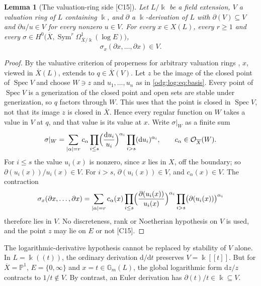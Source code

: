 \documentclass[11pt,oneside]{article}
\numberwithin{equation}{section}
\newtheorem{lemma}[lemma]{Lemma}
\theoremstyle{definition}
\theoremstyle{remark}
\newcommand{\src}[1]{\textup{\textsf{\small[#1]}}}
\newcommand{\Spec}{\operatorname{Spec}}
\newcommand{\Sym}{\operatorname{Sym}}
\newcommand{\dif}{\mathrm d}
\begin{document}
\begin{lemma}[The valuation-ring side \src{C15}]\label{odg:log:lem:valuation}
Let $L/\Bbbk$ be a field extension, $V$ a valuation ring of $L$ containing $\Bbbk$, and
$\partial$ a $\Bbbk$-derivation of $L$ with $\partial(V)\subseteq V$ and
$\partial u/u\in V$ for every nonzero $u\in V$. For every $x\in X(L)$, every $r\ge1$ and
every $\sigma\in H^0\bigl(\overline X,\Sym^r\Omega^1_{\overline X/\Bbbk}(\log E)\bigr)$,
\[
 \sigma_x(\partial x,\ldots,\partial x)\in V .
\]
\end{lemma}
\begin{proof}
By the valuative criterion of properness for arbitrary valuation rings
\cite[Tag 0BX5]{StacksProper}, $x$, viewed in $\overline X(L)$, extends to
$q\in\overline X(V)$. Let $z$ be the image of the closed point of $\Spec V$ and choose
$W\ni z$ and $u_1,\ldots,u_n$ as in \eqref{odg:log:eq:basis}. Every point of $\Spec V$
is a generization of the closed point and open sets are stable under generization,
so $q$ factors through $W$. This uses that the point is closed in
$\Spec V$, not that its image $z$ is closed in $\overline X$.
Hence every regular function on $W$ takes a value in $V$ at
$q$, and that value is its value at $x$. Write $\sigma|_W$ as a finite sum
\[
 \sigma|_W=\sum_{|\alpha|=r}c_\alpha\prod_{i\le s}\Bigl(\frac{\dif u_i}{u_i}\Bigr)^{\alpha_i}
 \prod_{i>s}(\dif u_i)^{\alpha_i},\qquad c_\alpha\in\mathcal O_{\overline X}(W).
\]
For $i\le s$ the value $u_i(x)$ is nonzero, since $x$ lies in $X$, off the boundary;
so $\partial(u_i(x))/u_i(x)\in V$. For $i>s$, $\partial(u_i(x))\in V$, and
$c_\alpha(x)\in V$. The contraction
\[
 \sigma_x(\partial x,\ldots,\partial x)=\sum_{|\alpha|=r}c_\alpha(x)
 \prod_{i\le s}\Bigl(\frac{\partial(u_i(x))}{u_i(x)}\Bigr)^{\alpha_i}
 \prod_{i>s}\bigl(\partial(u_i(x))\bigr)^{\alpha_i}
\]
therefore lies in $V$. No discreteness, rank or Noetherian hypothesis on $V$ is used,
and the point $z$ may lie on $E$ or not \src{C15}.
\end{proof}

The logarithmic-derivative hypothesis cannot be replaced by stability of
$V$ alone. In $L=\Bbbk((t))$, the ordinary derivation $\dif/\dif t$
preserves $V=\Bbbk[[t]]$. But for $\overline X=\mathbb P^1$,
$E=\{0,\infty\}$ and $x=t\in\mathbb G_m(L)$, the global logarithmic
form $\dif z/z$ contracts to $1/t\notin V$. By contrast, an Euler
derivation has $\partial(t)/t\in\Bbbk\subseteq V$.
\end{document}
